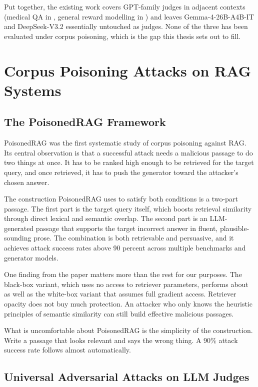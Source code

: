 Put together, the existing work covers GPT-family judges in adjacent contexts (medical QA in \citet{antaki2025gpt5}, general reward modelling in \citet{lail2026empirical}) and leaves Gemma-4-26B-A4B-IT and DeepSeek-V3.2 essentially untouched as judges. None of the three has been evaluated under corpus poisoning, which is the gap this thesis sets out to fill.

\section{Corpus Poisoning Attacks on RAG Systems}

\subsection{The PoisonedRAG Framework}

PoisonedRAG \citep{zou2025poisonedrag} was the first systematic study of corpus poisoning against RAG. Its central observation is that a successful attack needs a malicious passage to do two things at once. It has to be ranked high enough to be retrieved for the target query, and once retrieved, it has to push the generator toward the attacker's chosen answer.

The construction PoisonedRAG uses to satisfy both conditions is a two-part passage. The first part is the target query itself, which boosts retrieval similarity through direct lexical and semantic overlap. The second part is an LLM-generated passage that supports the target incorrect answer in fluent, plausible-sounding prose. The combination is both retrievable and persuasive, and it achieves attack success rates above 90 percent across multiple benchmarks and generator models.

One finding from the paper matters more than the rest for our purposes. The black-box variant, which uses no access to retriever parameters, performs about as well as the white-box variant that assumes full gradient access. Retriever opacity does not buy much protection. An attacker who only knows the heuristic principles of semantic similarity can still build effective malicious passages.

What is uncomfortable about PoisonedRAG is the simplicity of the construction. Write a passage that looks relevant and says the wrong thing. A 90\% attack success rate follows almost automatically.

\subsection{Universal Adversarial Attacks on LLM Judges}

